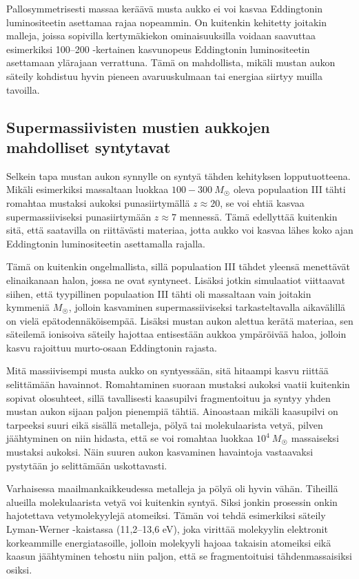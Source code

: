 \documentclass[12pt,a4paper]{article}
\begin{document}
Pallosymmetrisesti massaa keräävä musta aukko ei voi kasvaa Eddingtonin luminositeetin asettamaa rajaa nopeammin. On kuitenkin kehitetty joitakin malleja, joissa sopivilla kertymäkiekon ominaisuuksilla voidaan saavuttaa esimerkiksi 100--200 -kertainen kasvunopeus Eddingtonin luminositeetin asettamaan ylärajaan verrattuna. Tämä on mahdollista, mikäli mustan aukon säteily kohdistuu hyvin pieneen avaruuskulmaan tai energiaa siirtyy muilla tavoilla. \cite{sadowski}

\subsection[Mustien aukkojen synty]{Supermassiivisten mustien aukkojen mahdolliset syntytavat}
Selkein tapa mustan aukon synnylle on syntyä tähden kehityksen lopputuotteena. Mikäli esimerkiksi massaltaan luokkaa $100 - 300~M_{\astrosun}$ oleva populaation III tähti romahtaa mustaksi aukoksi punasiirtymällä $z \approx 20$, se voi ehtiä kasvaa supermassiiviseksi punasiirtymään $z\approx 7$ mennessä. Tämä edellyttää kuitenkin sitä, että saatavilla on riittävästi materiaa, jotta aukko voi kasvaa lähes koko ajan Eddingtonin luminositeetin asettamalla rajalla. \cite{whalen}

Tämä on kuitenkin ongelmallista, sillä populaation III tähdet yleensä menettävät elinaikanaan halon, jossa ne ovat syntyneet. Lisäksi jotkin simulaatiot viittaavat siihen, että tyypillinen populaation III tähti oli massaltaan vain joitakin kymmeniä $M_{\astrosun}$, jolloin kasvaminen supermassiiviseksi tarkasteltavalla aikavälillä on vielä epätodennäköisempää. Lisäksi mustan aukon alettua kerätä materiaa, sen säteilemä ionisoiva säteily hajottaa entisestään aukkoa ympäröivää haloa, jolloin kasvu rajoittuu murto-osaan Eddingtonin rajasta. \cite{whalen, alvarez}

Mitä massiivisempi musta aukko on syntyessään, sitä hitaampi kasvu riittää selittämään havainnot. Romahtaminen suoraan mustaksi aukoksi vaatii kuitenkin sopivat olosuhteet, sillä tavallisesti kaasupilvi fragmentoituu ja syntyy yhden mustan aukon sijaan paljon pienempiä tähtiä. Ainoastaan mikäli kaasupilvi on tarpeeksi suuri eikä sisällä metalleja, pölyä tai molekulaarista vetyä, pilven jäähtyminen on niin hidasta, että se voi romahtaa luokkaa $10^4\ M_{\astrosun}$ massaiseksi mustaksi aukoksi. Näin suuren aukon kasvaminen havaintoja vastaavaksi pystytään jo selittämään uskottavasti. \cite{rj}

Varhaisessa maailmankaikkeudessa metalleja ja pölyä oli hyvin vähän. Tiheillä alueilla molekulaarista vetyä voi kuitenkin syntyä. Siksi jonkin prosessin onkin hajotettava vetymolekyylejä atomeiksi. Tämän voi tehdä esimerkiksi säteily Lyman-Werner -kaistassa (11,2--13,6 eV), joka virittää molekyylin elektronit korkeammille energiatasoille, jolloin molekyyli hajoaa takaisin atomeiksi eikä kaasun jäähtyminen tehostu niin paljon, että se fragmentoituisi tähdenmassaisiksi osiksi. \cite{rj}
\end{document}
